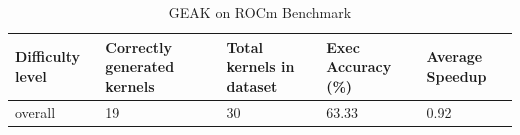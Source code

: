 \begin{table}
 \caption{GEAK on ROCm Benchmark}
  \centering
  \begin{tabular}{lllll}
    \toprule
    Difficulty level & Correctly generated kernels & Total kernels in dataset & Exec Accuracy (\%) & Average Speedup  \\
    \midrule
    overall & 19 & 30 & 63.33 & 0.92 \\
    \bottomrule
  \end{tabular}
  \label{tab:geak_on_rocm_mi300}
\end{table}